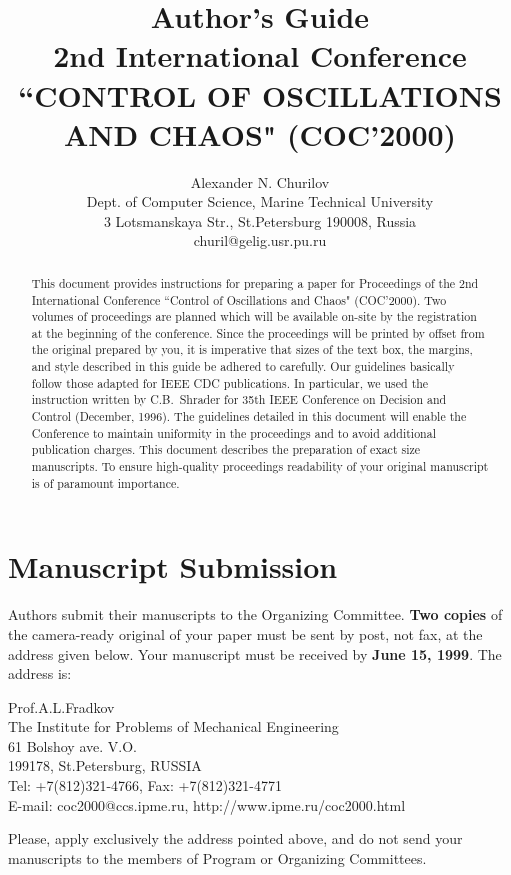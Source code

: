 

\pagestyle{empty}
\newtheorem{lemma}{Lemma}

\title{Author's Guide\\
2nd International Conference\\
``CONTROL OF OSCILLATIONS AND CHAOS" (COC'2000)
}

\author{Alexander N. Churilov\\
Dept. of Computer Science,
Marine Technical University\\
3 Lotsmanskaya Str.,
St.Petersburg 190008, Russia\\
churil@gelig.usr.pu.ru}
\date{}
\maketitle

\begin{abstract}
This document provides instructions for
preparing a paper for Proceedings of the
2nd International Conference
``Control of Oscillations and Chaos" (COC'2000).
Two volumes of proceedings are planned which
will be available on-site by the registration
at the beginning of the conference. Since the
proceedings will be printed by offset from
the original prepared by you, it is imperative
that sizes of the text box, the margins,
and style described in this
guide be adhered to carefully. Our guidelines
basically follow those adapted for IEEE CDC
publications. In particular, we used the instruction
written by C.B.~Shrader for 35th IEEE Conference on
Decision and Control (December, 1996).
The guidelines detailed in this document will
enable the Conference to maintain uniformity in
the proceedings and to avoid additional
publication charges.
This document describes the preparation of exact
size manuscripts. To ensure high-quality
proceedings readability of your original manuscript
is of paramount importance.
\end{abstract}

\section{Manuscript Submission}

Authors submit their manuscripts to the
Organizing Committee.
{\bf Two copies} of the camera-ready original of
your paper must be sent by post, not fax, at the
address given below. Your manuscript must
be received by {\bf June 15, 1999}.
The address is:
\begin{center}
Prof.A.L.Fradkov\\
The Institute for Problems of Mechanical Engineering\\
61 Bolshoy ave. V.O.\\
199178, St.Petersburg, RUSSIA\\
Tel: +7(812)321-4766, Fax: +7(812)321-4771\\
E-mail: coc2000@ccs.ipme.ru,
http://www.ipme.ru/coc2000.html
\end{center}
Please, apply exclusively the address pointed above, and
do not send your manuscripts to the members
of Program or Organizing Committees.

